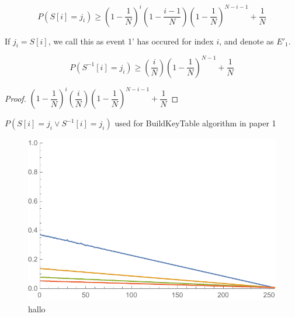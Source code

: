 \begin{thm}
\[	P(S[i] = j_{i}) \geq (1-\dfrac{1}{N})^{i}(1-\dfrac{i-1}{N})(1-\dfrac{1}{N})^{N-i-1}+ \dfrac{1}{N} \]
\end{thm}

\begin{defn}
	If $ j_{i} = S[i] $, we call this as event 1' has occured for index $ i $, and denote as $ E'_{1} $.
\end{defn}

\begin{thm}
	\[	P(S^{-1}[i] = j_{i}) \geq (\dfrac{i}{N})(1-\dfrac{1}{N})^{N-1}+ \dfrac{1}{N}\]
\end{thm}


\begin{proof}
		$ (1-\dfrac{1}{N})^{i}(\dfrac{i}{N})(1-\dfrac{1}{N})^{N-i-1}+ \dfrac{1}{N} $
\end{proof}

\begin{thm}
	$ P(S[i] = j_{i} \vee S^{-1}[i] = j_{i}) $ used for BuildKeyTable algorithm in paper 1
\end{thm}




\TODO{ $ P(S[S[S[i]] = j_{i}) $}

\begin{figure}
\centering
\includegraphics[width=0.7\linewidth]{img/all}
\caption[All]{hallo}
\label{fig:all}
\end{figure}






